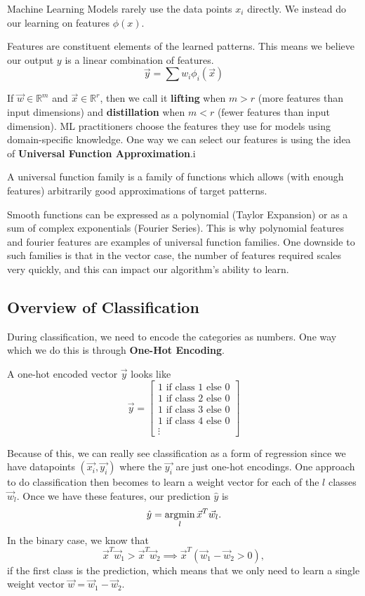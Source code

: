 Machine Learning Models rarely use the data points $x_i$ directly. We instead do our learning on features $\phi(x)$.
\begin{definition}
  Features are constituent elements of the learned patterns. This means we believe our output $y$ is a linear combination of features.
  \[
    \vec{y} = \sum w_i \phi_i(\vec{x})
  \]
  \label{defn:features}
\end{definition}
If $\vec{w}\in\mathbb{R}^m$ and $\vec{x}\in\mathbb{R}^r$, then we call it \textbf{lifting} when $m>r$ (more features than input dimensions) and \textbf{distillation} when $m < r$ (fewer features than input dimension).
ML practitioners choose the features they use for models using domain-specific knowledge.
One way we can select our features is using the idea of \textbf{Universal Function Approximation}.i
\begin{definition}
  A universal function family is a family of functions which allows (with enough features) arbitrarily good approximations of target patterns.
  \label{defn:universal-functions}
\end{definition}
Smooth functions can be expressed as a polynomial (Taylor Expansion) or as a sum of complex exponentials (Fourier Series). This is why polynomial features and fourier features are examples of universal function families.
One downside to such families is that in the vector case, the number of features required scales very quickly, and this can impact our algorithm's ability to learn.
\subsection{Overview of Classification}
During classification, we need to encode the categories as numbers. One way which we do this is through \textbf{One-Hot Encoding}.
\begin{definition}
  A one-hot encoded vector $\vec{y}$ looks like 
  \[
    \vec{y} = 
      \begin{bmatrix} 
	1 \text{ if class 1 else } 0\\
	1 \text{ if class 2 else } 0\\
	1 \text{ if class 3 else } 0\\
	1 \text{ if class 4 else } 0\\
	\vdots
      \end{bmatrix} 
  \]
  \label{defn:one-hot}
\end{definition}
Because of this, we can really see classification as a form of regression since we have datapoints $(\vec{x_i}, \vec{y_i})$ where the $\vec{y_i}$ are just one-hot encodings. One approach to do classification then becomes to learn a weight vector for each of the $l$ classes $\vec{w}_l$. Once we have these features, our prediction $\hat{y}$ is $$\hat{y} = \operatorname*{argmin}_{l}\vec{x}^T\vec{w}_l.$$
In the binary case, we know that $$\vec{x}^T\vec{w}_1 > \vec{x}^T\vec{w}_2\implies\vec{x}^T(\vec{w}_1-\vec{w}_2 > 0),$$ if the first class is the prediction, which means that we only need to learn a single weight vector $\vec{w}=\vec{w}_1-\vec{w}_2$.
